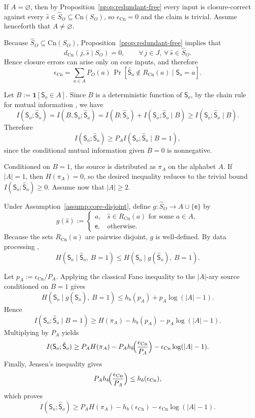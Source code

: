 \documentclass[journal,onecolumn]{IEEEtran}
\makeatletter
\newcommand{\Cn}{\text{Cn}}
\numberwithin{equation}{section}
\renewenvironment{proof}[1][\proofname]{\par
  \pushQED{\qed}%
  \normalfont \topsep6\p@\@plus6\p@\relax
  \trivlist
  \item[\hskip\labelsep
        \itshape
    #1\@addpunct{.}]\ignorespaces
}{%
  \popQED\endtrivlist\@endpefalse
}
\makeatother
\begin{document}
\begin{proof}
If \(A=\varnothing\), then by Proposition~\ref{prop:redundant-free}
every input is closure-correct against every
\(\hat s\in\hat S_O\subseteq\Cn(S_O)\), so
\(\epsilon_{\Cn}=0\) and the claim is trivial.
Assume henceforth that \(A\neq\varnothing\).

Because \(\hat S_O\subseteq\Cn(S_O)\), Proposition~\ref{prop:redundant-free}
implies that
\[
  d_{\Cn}(j,\hat s\mid S_O)=0,
  \qquad
  \forall\,j\in J,\ \forall\,\hat s\in\hat S_O.
\]
Hence closure errors can arise only on core inputs, and therefore
\[
  \epsilon_{\Cn}
  =
  \sum_{a\in A}P_O(a)\,
  \Pr[\hat {\mathsf{S}}_o\notin R_{\Cn}(a)\mid {\mathsf{S}}_o=a].
\]

Let \(B:=\mathbf{1}[{\mathsf{S}}_o\in A]\).
Since \(B\) is a deterministic function of \({\mathsf{S}}_o\), by the chain rule for mutual information \cite[Ch.~2]{cover2006elements}\cite[Ch.~3]{csiszar2011information}, we have
\[
  I({\mathsf{S}}_o;\hat {\mathsf{S}}_o)=I(B,{\mathsf{S}}_o;\hat {\mathsf{S}}_o)
  =I(B;\hat {\mathsf{S}}_o)+I({\mathsf{S}}_o;\hat {\mathsf{S}}_o\mid B)
  \ge I({\mathsf{S}}_o;\hat {\mathsf{S}}_o\mid B).
\]
Therefore
\[
  I({\mathsf{S}}_o;\hat {\mathsf{S}}_o)\ge
  P_A I({\mathsf{S}}_o;\hat {\mathsf{S}}_o\mid B=1),
\]
since the conditional mutual information given \(B=0\) is
nonnegative.

Conditioned on \(B=1\), the source is distributed as \(\pi_A\) on
the alphabet \(A\).
If \(|A|=1\), then \(H(\pi_A)=0\), so the desired inequality reduces
to the trivial bound \(I({\mathsf{S}}_o;\hat {\mathsf{S}}_o)\ge 0\).
Assume now that \(|A|\ge 2\).

Under Assumption~\ref{assump:core-disjoint}, define
\(g:\hat S_O\to A\cup\{\mathsf e\}\) by
\[
  g(\hat s)
  :=
  \begin{cases}
    a, & \hat s\in R_{\Cn}(a)\text{ for some }a\in A,\\
    \mathsf e, & \text{otherwise}.
  \end{cases}
\]
Because the sets \(R_{\Cn}(a)\) are pairwise disjoint, \(g\) is
well-defined.
By data processing \cite[Ch.~2]{cover2006elements},
\[
  H({\mathsf{S}}_o\mid \hat {\mathsf{S}}_o,\ B=1)
  \le
  H({\mathsf{S}}_o\mid g(\hat {\mathsf{S}}_o),\ B=1).
\]

Let \(p_A:=\epsilon_{\Cn}/P_A\).
Applying the classical Fano inequality
\cite[Ch.~2]{cover2006elements}\cite[Ch.~3]{csiszar2011information}
to the \(|A|\)-ary source conditioned on \(B=1\) gives
\[
  H({\mathsf{S}}_o\mid g(\hat {\mathsf{S}}_o),\ B=1)
  \le
  h_b(p_A)+p_A\log(|A|-1).
\]
Hence
\[
  I({\mathsf{S}}_o;\hat {\mathsf{S}}_o\mid B=1)
  \ge
  H(\pi_A)-h_b(p_A)-p_A\log(|A|-1).
\]
Multiplying by \(P_A\) yields
\[
  I({\mathsf{S}}_o;\hat {\mathsf{S}}_o)
  \ge
  P_AH(\pi_A)
  -P_A h_b\!\Bigl(\frac{\epsilon_{\Cn}}{P_A}\Bigr)
  -\epsilon_{\Cn}\log(|A|-1).
\]
Finally, Jensen's inequality gives
\[
  P_A h_b\!\Bigl(\frac{\epsilon_{\Cn}}{P_A}\Bigr)
  \le
  h_b(\epsilon_{\Cn}),
\]
which proves
\[
  I({\mathsf{S}}_o;\hat {\mathsf{S}}_o)
  \ge
  P_AH(\pi_A)-h_b(\epsilon_{\Cn})
  -\epsilon_{\Cn}\log(|A|-1).
\]
\end{proof}
\end{document}
